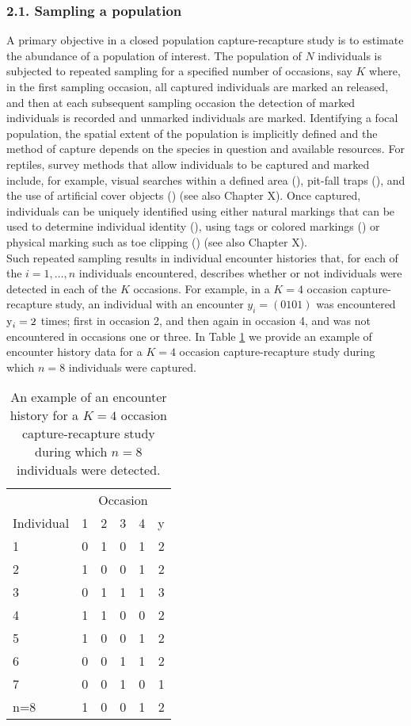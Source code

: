 \documentclass{book}
\begin{document}
\subsubsection*{2.1. Sampling a population}
A primary objective in a closed population capture-recapture study is to estimate the abundance of a population of interest. The population of $N$ individuals is subjected to repeated sampling for a specified number of occasions, say $K$ where, in the first sampling occasion, all captured individuals are marked an released, and then at each subsequent sampling occasion the detection of marked individuals is recorded and unmarked individuals are marked. Identifying a focal population, the spatial extent of the population is implicitly defined and the method of capture depends on the species in question and available resources. For reptiles, survey methods that allow individuals to be captured and marked include, for example, visual searches within a defined area (), pit-fall traps (), and the use of artificial cover objects () (see also Chapter X). Once captured, individuals can be uniquely identified using either natural markings that can be used to determine individual identity (), using tags or colored markings () or physical marking such as toe clipping () (see also Chapter X).\\

Such repeated sampling results in individual encounter histories that, for each of the $i=1,\ldots,n$ individuals encountered, describes whether or not individuals were detected in each of the $K$ occasions. For example, in a $K = 4$ occasion capture-recapture study, an individual with an encounter $y_i = (0 1 0 1)$ was encountered $\hbox{y}_i = 2$ times; first in occasion 2, and then again in occasion 4, and was not encountered in occasions one or three. In Table \ref{enchist} we provide an example of encounter history data for a $K=4$ occasion capture-recapture study during which $n=8$ individuals were captured.

\begin{table}[h]
  \centering
  \caption{An example of an encounter history for a $K = 4$ occasion capture-recapture study during which $n=8$ individuals were detected.}
  \label{enchist}
 \begin{tabular}{lccccr}
 \hline
    &\multicolumn{5}{c}{Occasion} \\
  Individual & 1 & 2 & 3 & 4 & y\\
 \hline
  1   & 0 & 1 & 0 & 1 & 2 \\
  2   & 1 & 0 & 0 & 1 & 2 \\
  3   & 0 & 1 & 1 & 1 & 3 \\
  4   & 1 & 1 & 0 & 0 & 2 \\
  5   & 1 & 0 & 0 & 1 & 2 \\
  6   & 0 & 0 & 1 & 1 & 2 \\
  7   & 0 & 0 & 1 & 0 & 1 \\
  n=8 & 1 & 0 & 0 & 1 & 2 \\
 \hline
 \end{tabular}
\end{table}
\end{document}
